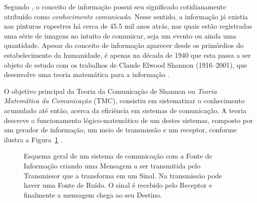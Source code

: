 \documentclass[12pt,oneside,brazil,hidelinks,article,sumario=tradicional,a4paper]{abntex2}
\begin{document}
Segundo \textcite{conceitoinformação}, o conceito de informação possui seu significado cotidianamente atribuído como \textit{conhecimento comunicado}. Nesse sentido, a informação já existia nas pinturas rupestres há cerca de \num{45,5} mil anos atrás, nas quais estão registradas uma série de imagens no intuito de comunicar, seja um evento ou ainda uma quantidade. Apesar do conceito de informação aparecer desde os primórdios do estabelecimento da humanidade, é apenas na década de 1940 que esta passa a ser objeto de estudo com os trabalhos de Claude Elwood Shannon (1916--2001), que desenvolve uma teoria matemática para a informação \cite{CiênciaTransiçãoSeculosa}.

O objetivo principal da Teoria da Comunicação de Shannon ou \textit{Teoria Matemática da Comunicação} (TMC), consistiu em sistematizar o conhecimento acumulado até então, acerca da eficiência em sistemas de comunicação. A teoria descreve o funcionamento lógico-matemático de um destes sistemas, composto por um gerador de informação, um meio de transmissão e um receptor, conforme ilustra a Figura~\ref{comunicshannon} \cite{MTC}.

\begin{figure}[ht!]
  \centering
  \caption{Esquema geral de um sistema de comunicação com a Fonte de Informação criando uma Mensagem a ser transmitida pelo Transmissor que a transforma em um Sinal. Na transmissão pode haver uma Fonte de Ruído. O sinal é recebido pelo Receptor e finalmente a mensagem chega ao seu Destino.}\label{comunicshannon}
\end{figure}
\end{document}
